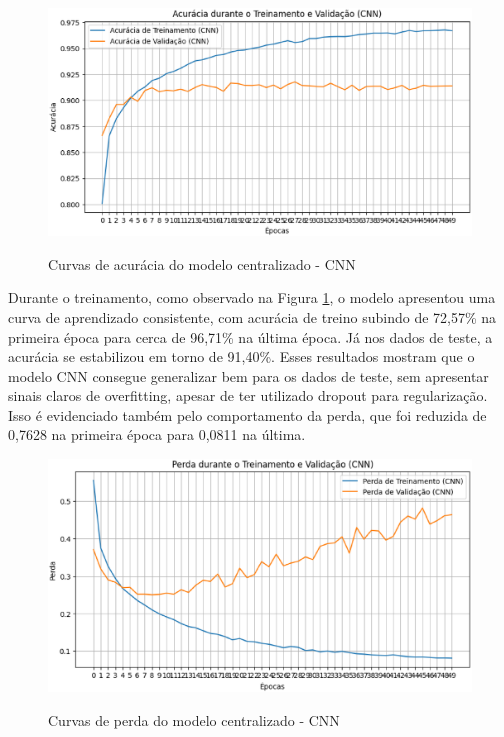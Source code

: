 \begin{figure}[ht]
    \centering
    \caption{Curvas de acurácia do modelo centralizado - CNN}
    \includegraphics[scale=0.4]{figuras/analiseResultados/acuracyCNN.eps}
    \label{fig:acuracyCNN}
\end{figure}

Durante o treinamento, como observado na Figura \ref{fig:acuracyCNN}, o modelo apresentou uma curva de aprendizado consistente, com acurácia de treino subindo de 72,57\% na primeira época para cerca de 96,71\% na última época. Já nos dados de teste, a acurácia se estabilizou em torno de 91,40\%. Esses resultados mostram que o modelo CNN consegue generalizar bem para os dados de teste, sem apresentar sinais claros de overfitting, apesar de ter utilizado dropout para regularização. Isso é evidenciado também pelo comportamento da perda, que foi reduzida de 0,7628 na primeira época para 0,0811 na última.

\begin{figure}[ht]
    \centering
    \caption{Curvas de perda do modelo centralizado - CNN}
    \includegraphics[scale=0.4]{figuras/analiseResultados/lossCNN.eps}
    \label{fig:lossCNN}
\end{figure}

